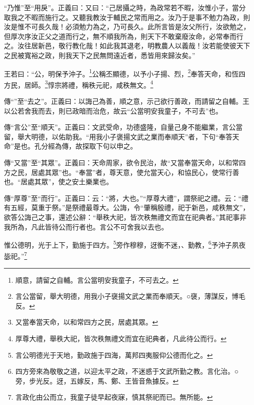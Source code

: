 {\noindent\shu{}\fzkt “乃惟”至“用戾”。正義曰：又曰：“己居攝之時，為政常若不暇，汝惟小子，當分取我之不暇而施行之。又聽我教汝于輔民之常而用之。汝乃于是事不勉力為政，則汝是惟不可長久哉！必須勉力為之，乃可長久。此所言皆是汝父所行，汝欲勉之，但厚次序汝正父之道而行之，無不順我所為，則天下不敢棄廢汝命，必常奉而行之。汝往居新邑，敬行教化哉！如此我其退老，明教農人以義哉！汝若能使彼天下之民被寬裕之政，則我天下之民無問遠近者，悉皆用來歸汝矣。” \par}

王若曰：“公，明保予沖子。\footnote{順意，請留之自輔。言公當明安我童子，不可去之。}公稱丕顯德，以予小子揚、烈，\footnote{言公當留，舉大明德，用我小子襃揚文武之業而奉順天。○襃，薄謀反，博毛反。}奉答天命，和恆四方民，居師。\footnote{又當奉當天命，以和常四方之民，居處其眾。}惇宗將禮，稱秩元祀，咸秩無文。\footnote{厚尊大禮，舉秩大祀，皆次秩無禮文而宜在祀典者，凡此待公而行。}


{\noindent\zhuan{}\fzbyks 傳“”至“去之”。正義曰：以誨己為善，順之意，示己欲行善政，而請留之自輔。王以公若舍我而去，則已政暗而治危，故云“公當明安我童子，不可去”也。 \par}

{\noindent\zhuan{}\fzbyks 傳“言公”至“順天”。正義曰：文武受命，功德盛隆，自量己身不能繼業，言公當留，舉大明德，以佑助我。“用我小子褒揚文武之業而奉順天”者，下句“奉答天命”是也。孔分經為傳，故探取下句以申之。 \par}

{\noindent\zhuan{}\fzbyks 傳“又當”至“其眾”。正義曰：天命周家，欲令民治，故“又當奉當天命，以和常四方之民，居處其眾”也。“奉當”者，尊天意，使允當天心，和協民心，使常行善也。“居處其眾”，使之安土樂業也。 \par}

{\noindent\zhuan{}\fzbyks 傳“厚尊”至“而行”。正義曰：云：“將，大也。”“厚尊大禮”，謂祭祀之禮。云：“禮有五經，莫重于祭。”是祭禮最尊大。公誨，令“肇稱殷禮，祀于新邑，咸秩無文”，欲答公誨己之事，還述公辭：“舉秩大祀，皆次秩無禮文而宜在祀典者。”其祀事非我所為，凡此皆待公而行者也。言公不可舍我以去也。 \par}

惟公德明，光于上下，勤施于四方。\footnote{言公明德光于天地，勤政施于四海，萬邦四夷服仰公德而化之。}旁作穆穆，迓衡不迷，、勤教，\footnote{四方旁來為敬敬之道，以迎太平之政，不迷惑于文武所勤之教。言化治。○旁，步光反。迓，五嫁反，馬、鄭、王皆音魚據反。}予沖子夙夜毖祀。”\footnote{言政化由公而立，我童子徒早起夜寐，慎其祭祀而已。無所能。}

